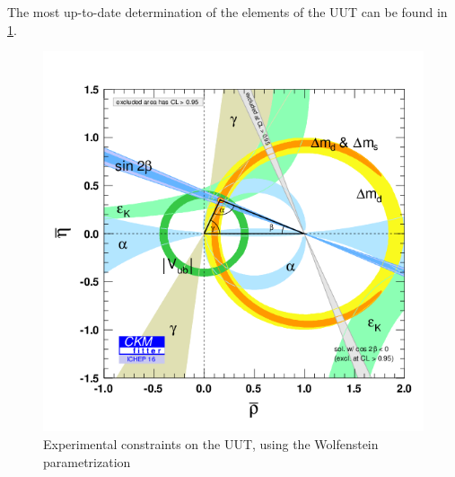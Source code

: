 The most up-to-date determination of the elements of the UUT can be found in \ref{fig:uutEXP}. 
\begin{figure} [htb!]
\begin{center}
\includegraphics[scale=0.5]{figs/uut_CKMFitter.png}
\caption{Experimental constraints on the UUT, using the Wolfenstein parametrization ~\cite{CKMFitter}\label{fig:uutEXP}}
\end{center}
\end{figure}

~\cite{Fellini4}


